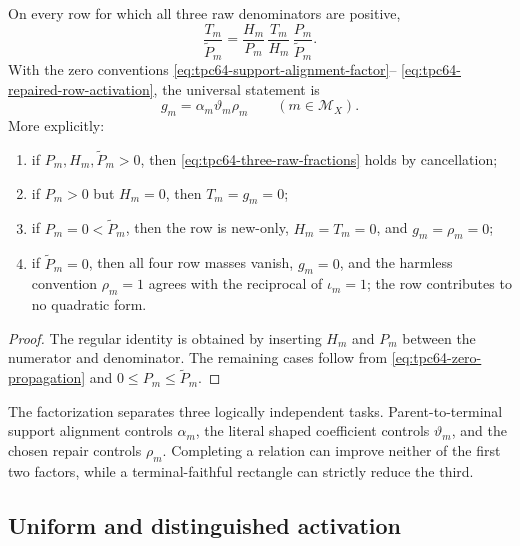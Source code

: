 \begin{theorem}
\label{thm:tpc64-exact-three-factor-activation}
On every row for which all three raw denominators are positive,
\begin{equation}
 \boxed{
 \frac{T_m}{\widetilde P_m}
 =
 \frac{H_m}{P_m}\,
 \frac{T_m}{H_m}\,
 \frac{P_m}{\widetilde P_m}.}
 \label{eq:tpc64-three-raw-fractions}
\end{equation}
With the zero conventions
\eqref{eq:tpc64-support-alignment-factor}--
\eqref{eq:tpc64-repaired-row-activation}, the universal statement is
\begin{equation}
 \boxed{g_m=\alpha_m\vartheta_m\rho_m}
 \qquad(m\in\mathcal M_X).
 \label{eq:tpc64-three-factor-activation}
\end{equation}
More explicitly:
\begin{enumerate}[label=\textup{(\roman*)},leftmargin=3em]
 \item if \(P_m,H_m,\widetilde P_m>0\), then
       \eqref{eq:tpc64-three-raw-fractions} holds by cancellation;
 \item if \(P_m>0\) but \(H_m=0\), then \(T_m=g_m=0\);
 \item if \(P_m=0<\widetilde P_m\), then the row is new-only,
       \(H_m=T_m=0\), and \(g_m=\rho_m=0\);
 \item if \(\widetilde P_m=0\), then all four row masses vanish,
       \(g_m=0\), and the harmless convention \(\rho_m=1\) agrees with
       the reciprocal of \(\iota_m=1\); the row contributes to no
       quadratic form.
\end{enumerate}
\end{theorem}

\begin{proof}
The regular identity is obtained by inserting \(H_m\) and \(P_m\) between
the numerator and denominator.  The remaining cases follow from
\eqref{eq:tpc64-zero-propagation} and
\(0\le P_m\le\widetilde P_m\).
\end{proof}

The factorization separates three logically independent tasks.
Parent-to-terminal support alignment controls \(\alpha_m\), the literal
shaped coefficient controls \(\vartheta_m\), and the chosen repair controls
\(\rho_m\).  Completing a relation can improve neither of the first two
factors, while a terminal-faithful rectangle can strictly reduce the third.

\subsection{Uniform and distinguished activation}

